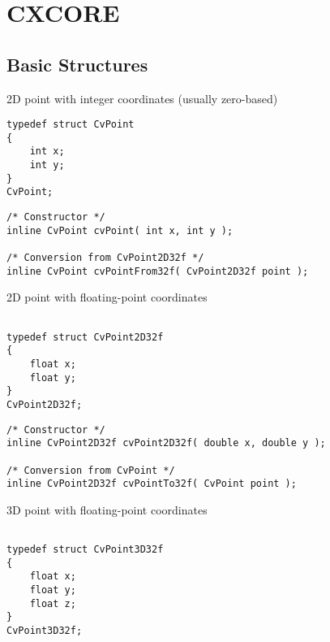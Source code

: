 \chapter{CXCORE}

\section{Basic Structures}

\label{CvPoint}

2D point with integer coordinates (usually zero-based)

\begin{lstlisting}
typedef struct CvPoint
{
    int x; 
    int y; 
}
CvPoint;
\end{lstlisting}

\begin{description}
\end{description}

\begin{lstlisting}
/* Constructor */
inline CvPoint cvPoint( int x, int y );

/* Conversion from CvPoint2D32f */
inline CvPoint cvPointFrom32f( CvPoint2D32f point );
\end{lstlisting}


\label{CvPoint2D32f}

2D point with floating-point coordinates

\begin{lstlisting}

typedef struct CvPoint2D32f
{
    float x;
    float y; 
}
CvPoint2D32f;
\end{lstlisting}

\begin{description}
\end{description}

\begin{lstlisting}
/* Constructor */
inline CvPoint2D32f cvPoint2D32f( double x, double y );

/* Conversion from CvPoint */
inline CvPoint2D32f cvPointTo32f( CvPoint point );

\end{lstlisting}


\label{CvPoint3D32f}

3D point with floating-point coordinates

\begin{lstlisting}

typedef struct CvPoint3D32f
{
    float x; 
    float y; 
    float z; 
}
CvPoint3D32f;
\end{lstlisting}

